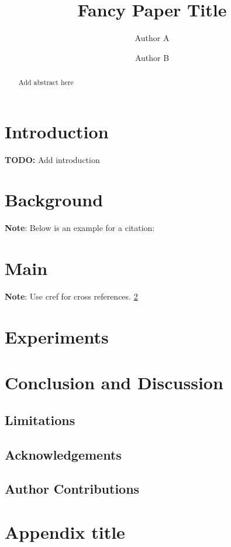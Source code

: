 \documentclass{article}
\def\todo#1{\textcolor{colour2}{\textbf{TODO:} #1}\xspace}
\def\note#1{\textcolor{colour1}{\textbf{Note}: #1}\xspace}
\begin{document}
\title{Fancy Paper Title}

\author{%
	Author A \and Author B
}

\maketitle

\begin{abstract}
    Add abstract here
\end{abstract}


\section{Introduction}\label{sec:introduction}
\todo{Add introduction}

\section{Background}\label{sec:background}
\note{Below is an example for a citation:}
\cite{williams2006gaussian}

\section{Main}\label{sec:main}
\note{Use cref for cross references.}
\cref{sec:background}

\section{Experiments}\label{sec:experiments}

\section{Conclusion and Discussion}\label{s:ccl}

\subsection{Limitations}

\subsection*{Acknowledgements}
\subsection*{Author Contributions}

 

\newpage
\appendix
\section{Appendix title}\label{a:appendix1}
\end{document}
